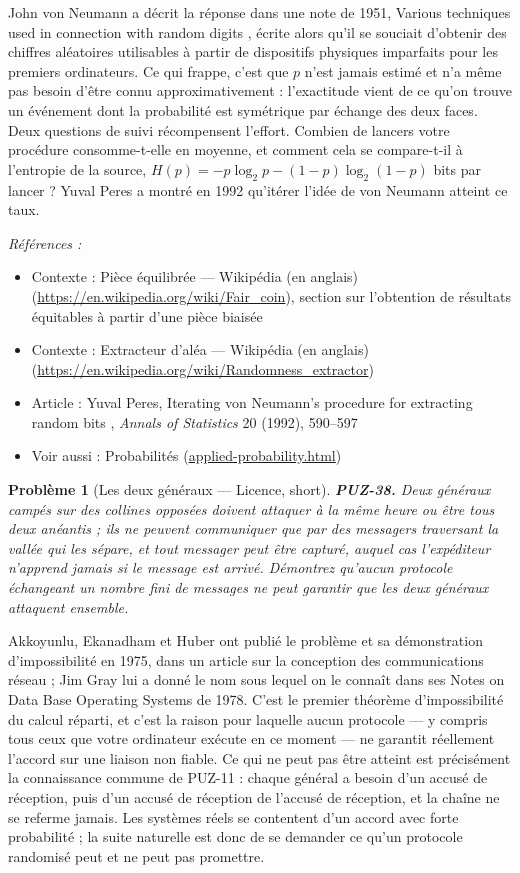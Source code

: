 \documentclass[11pt]{article}
\newtheorem{problem}{Problème}
\newenvironment{refs}{\par\small\noindent\emph{Références :}\begin{itemize}\setlength\itemsep{0pt}}{\end{itemize}\normalsize}
\begin{document}
\noindent John von Neumann a décrit la réponse dans une note de 1951, \og{} Various
techniques used in connection with random digits \fg{}, écrite alors qu'il se souciait d'obtenir
des chiffres aléatoires utilisables à partir de dispositifs physiques imparfaits pour les
premiers ordinateurs. Ce qui frappe, c'est que $ p $ n'est jamais estimé et n'a même pas
besoin d'être connu approximativement : l'exactitude vient de ce qu'on trouve un événement
dont la probabilité est symétrique par échange des deux faces. Deux questions de suivi
récompensent l'effort. Combien de lancers votre procédure consomme-t-elle en moyenne, et
comment cela se compare-t-il à l'entropie de la source,
$ H(p) = -p\log_2 p - (1-p)\log_2(1-p) $ bits par lancer ? Yuval Peres a montré en 1992
qu'itérer l'idée de von Neumann atteint ce taux.

\begin{refs}
\item Contexte : Pièce équilibrée --- Wikipédia (en anglais) (\url{https://en.wikipedia.org/wiki/Fair_coin}), section sur l'obtention de résultats équitables à partir d'une pièce biaisée
\item Contexte : Extracteur d'aléa --- Wikipédia (en anglais) (\url{https://en.wikipedia.org/wiki/Randomness_extractor})
\item Article : Yuval Peres, \og{} Iterating von Neumann's procedure for extracting random bits \fg{}, \textit{Annals of Statistics} 20 (1992), 590--597
\item Voir aussi : Probabilités (\url{applied-probability.html})
\end{refs}

\bigskip

\begin{problem}[{Les deux généraux --- Licence, short}]
\textbf{PUZ-38.} Deux généraux campés sur des collines opposées doivent
attaquer à la même heure ou être tous deux anéantis ; ils ne peuvent communiquer que par des
messagers traversant la vallée qui les sépare, et tout messager peut être capturé, auquel
cas l'expéditeur n'apprend jamais si le message est arrivé. Démontrez qu'aucun protocole
échangeant un nombre fini de messages ne peut garantir que les deux généraux attaquent
ensemble.
\end{problem}

\noindent Akkoyunlu, Ekanadham et Huber ont publié le problème et sa démonstration
d'impossibilité en 1975, dans un article sur la conception des communications réseau ; Jim
Gray lui a donné le nom sous lequel on le connaît dans ses \og{} Notes on Data Base Operating
Systems \fg{} de 1978. C'est le premier théorème d'impossibilité du calcul réparti, et c'est la
raison pour laquelle aucun protocole --- y compris tous ceux que votre ordinateur exécute en ce
moment --- ne garantit réellement l'accord sur une liaison non fiable. Ce qui ne peut pas être
atteint est précisément la connaissance commune de PUZ-11 : chaque général a besoin d'un
accusé de réception, puis d'un accusé de réception de l'accusé de réception, et la chaîne ne
se referme jamais. Les systèmes réels se contentent d'un accord avec forte probabilité ; la
suite naturelle est donc de se demander ce qu'un protocole randomisé peut et ne peut pas
promettre.
\end{document}
